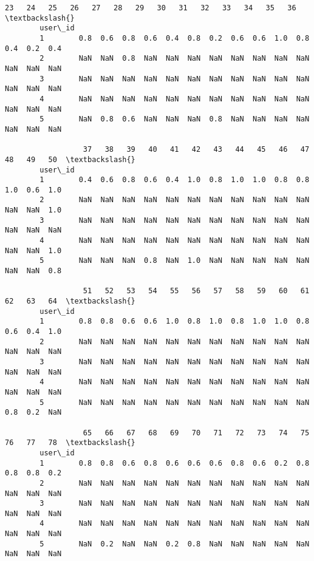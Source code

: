 \documentclass[11pt]{article}
\begin{document}
\begin{Verbatim}[commandchars=\\\{\}]
                  23   24   25   26   27   28   29   30   31   32   33   34   35   36  \textbackslash{}
        user\_id                                                                         
        1        0.8  0.6  0.8  0.6  0.4  0.8  0.2  0.6  0.6  1.0  0.8  0.4  0.2  0.4   
        2        NaN  NaN  0.8  NaN  NaN  NaN  NaN  NaN  NaN  NaN  NaN  NaN  NaN  NaN   
        3        NaN  NaN  NaN  NaN  NaN  NaN  NaN  NaN  NaN  NaN  NaN  NaN  NaN  NaN   
        4        NaN  NaN  NaN  NaN  NaN  NaN  NaN  NaN  NaN  NaN  NaN  NaN  NaN  NaN   
        5        NaN  0.8  0.6  NaN  NaN  NaN  0.8  NaN  NaN  NaN  NaN  NaN  NaN  NaN   
        
                  37   38   39   40   41   42   43   44   45   46   47   48   49   50  \textbackslash{}
        user\_id                                                                         
        1        0.4  0.6  0.8  0.6  0.4  1.0  0.8  1.0  1.0  0.8  0.8  1.0  0.6  1.0   
        2        NaN  NaN  NaN  NaN  NaN  NaN  NaN  NaN  NaN  NaN  NaN  NaN  NaN  1.0   
        3        NaN  NaN  NaN  NaN  NaN  NaN  NaN  NaN  NaN  NaN  NaN  NaN  NaN  NaN   
        4        NaN  NaN  NaN  NaN  NaN  NaN  NaN  NaN  NaN  NaN  NaN  NaN  NaN  1.0   
        5        NaN  NaN  NaN  0.8  NaN  1.0  NaN  NaN  NaN  NaN  NaN  NaN  NaN  0.8   
        
                  51   52   53   54   55   56   57   58   59   60   61   62   63   64  \textbackslash{}
        user\_id                                                                         
        1        0.8  0.8  0.6  0.6  1.0  0.8  1.0  0.8  1.0  1.0  0.8  0.6  0.4  1.0   
        2        NaN  NaN  NaN  NaN  NaN  NaN  NaN  NaN  NaN  NaN  NaN  NaN  NaN  NaN   
        3        NaN  NaN  NaN  NaN  NaN  NaN  NaN  NaN  NaN  NaN  NaN  NaN  NaN  NaN   
        4        NaN  NaN  NaN  NaN  NaN  NaN  NaN  NaN  NaN  NaN  NaN  NaN  NaN  NaN   
        5        NaN  NaN  NaN  NaN  NaN  NaN  NaN  NaN  NaN  NaN  NaN  0.8  0.2  NaN   
        
                  65   66   67   68   69   70   71   72   73   74   75   76   77   78  \textbackslash{}
        user\_id                                                                         
        1        0.8  0.8  0.6  0.8  0.6  0.6  0.6  0.8  0.6  0.2  0.8  0.8  0.8  0.2   
        2        NaN  NaN  NaN  NaN  NaN  NaN  NaN  NaN  NaN  NaN  NaN  NaN  NaN  NaN   
        3        NaN  NaN  NaN  NaN  NaN  NaN  NaN  NaN  NaN  NaN  NaN  NaN  NaN  NaN   
        4        NaN  NaN  NaN  NaN  NaN  NaN  NaN  NaN  NaN  NaN  NaN  NaN  NaN  NaN   
        5        NaN  0.2  NaN  NaN  0.2  0.8  NaN  NaN  NaN  NaN  NaN  NaN  NaN  NaN   
        

\end{Verbatim}
\end{document}
